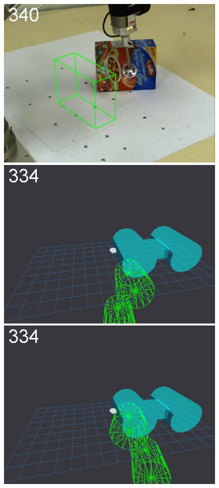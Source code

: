 \begin{figure}[t]
{\includegraphics[width=\imgCXwid]{./C1_LWPR1_87_5}
\includegraphics[width=\imgCXwid]{./C5_1exp_6_5}
\includegraphics[width=\imgCXwid]{./C5_2exp_6_5}
}
\end{figure}
